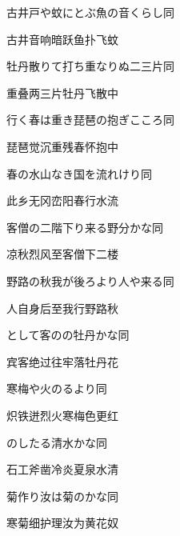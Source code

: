 \begin{haiku}
    {\FH 古井戸や蚊にとぶ魚の音くらし}\hfill{\FH 同}

    {\FK 古井音响暗跃鱼扑飞蚊}
\end{haiku}

\begin{haiku}
    {\FH 牡丹散りて打ち重なりぬ二三片}\hfill{\FH 同}

    {\FK 重叠两三片牡丹飞散中}
\end{haiku}

\begin{haiku}
    {\FH 行く春は重き琵琶の抱ぎこころ}\hfill{\FH 同}

    {\FK 琵琶觉沉重残春怀抱中}
\end{haiku}

\begin{haiku}
    {\FH 春の水山なき国を流れけり}\hfill{\FH 同}

    {\FK 此乡无冈峦阳春行水流}
\end{haiku}

\begin{haiku}
    {\FH 客僧の二階下り来る野分かな}\hfill{\FH 同}

    {\FK 凉秋烈风至客僧下二楼}
\end{haiku}

\begin{haiku}
    {\FH 野路の秋我が後ろより人や来る}\hfill{\FH 同}

    {\FK 人自身后至我行野路秋}
\end{haiku}

\begin{haiku}
    {\FH {}として客のの牡丹かな}\hfill{\FH 同}

    {\FK 宾客绝过往牢落牡丹花}
\end{haiku}

\begin{haiku}
    {\FH 寒梅や火のるより}\hfill{\FH 同}

    {\FK 炽铁迸烈火寒梅色更红}
\end{haiku}

\begin{haiku}
    {\FH {}のしたる清水かな}\hfill{\FH 同}

    {\FK 石工斧凿冷炎夏泉水清}
\end{haiku}

\begin{haiku}
    {\FH 菊作り汝は菊のかな}\hfill{\FH 同}

    {\FK 寒菊细护理汝为黄花奴}
\end{haiku}

